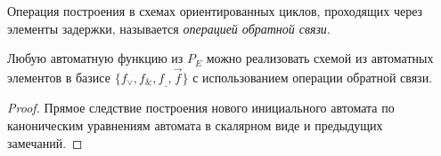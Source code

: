 \begin{definition}
    Операция построения в схемах ориентированных циклов, проходящих через элементы задержки, называется \textit{операцией обратной связи}.
\end{definition}

\begin{theorem}
    Любую автоматную функцию из $P_E$ можно реализовать схемой из автоматных элементов в базисе $\{f_\vee, f_\&, f_\_, \vec{f}\}$ с использованием операции обратной связи.
\end{theorem}

\begin{proof}
    Прямое следствие построения нового инициального автомата по каноническим уравнениям автомата в скалярном виде и предыдущих замечаний.
\end{proof}